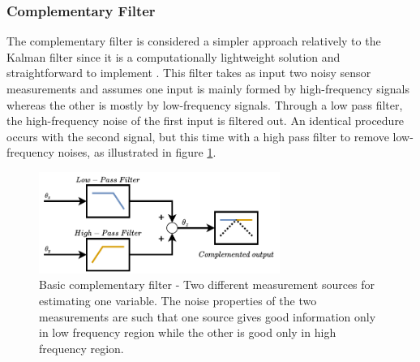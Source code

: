 

\subsubsection{Complementary Filter}

The complementary filter is considered a simpler approach relatively to the Kalman filter since it is a computationally lightweight solution and straightforward to implement \cite{higgins1975comparison}. This filter takes as input two noisy sensor measurements and assumes one input is mainly formed by high-frequency signals whereas the other is mostly by low-frequency signals. Through a low pass filter, the high-frequency noise of the first input is filtered out. An identical procedure occurs with the second signal, but this time with a high pass filter to remove low-frequency noises, as illustrated in figure \ref{fig:complementary}.

\begin{figure}[!h]
    \centering
    \includegraphics[width=0.7\textwidth]{figures/complementary.pdf}
    \caption{Basic complementary filter \cite{higgins1975comparison} - Two different measurement sources for estimating one variable. The noise properties of the two measurements are such that one source gives good information only in low frequency region while the other is good only in high frequency region. }
    \label{fig:complementary}
\end{figure}

